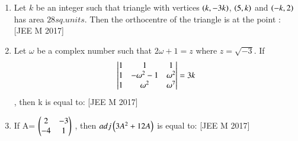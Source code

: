 \documentclass[journal,,12pt,onecolumn]{IEEEtran}
\theoremstyle{remark}
\begin{document}
\begin{enumerate}
    \item Let $k$ be an integer such that triangle with vertices $\left(k,-3k\right)$, $\left(5,k\right)$ and $\left(-k,2\right)$ has area $28 sq. units$. Then the orthocentre of the triangle is at the point :
    \hfill{[JEE M 2017]}
    \begin{enumerate}
    \end{enumerate}
    \item Let $\omega$ be a complex number such that $2\omega + 1=z$ where $z=\sqrt{-3}$. If \begin{align}\begin{vmatrix}
1 & 1  & 1 \\
1 & -\omega^2-1 & \omega^2 \\
1 & \omega^2 & \omega^7 
\end{vmatrix}=3k \end{align}, then k is equal to:
\hfill{[JEE M 2017]}
\begin{enumerate}
\end{enumerate}
\item If A= $\begin{pmatrix}
    2 & -3 \\
    -4 & 1
\end{pmatrix}$
    , then $adj\left(3A^2+12A\right)$ is equal to:
\hfill{[JEE M 2017]}
\begin{enumerate}
\end{enumerate}
\end{enumerate}
\end{document}
